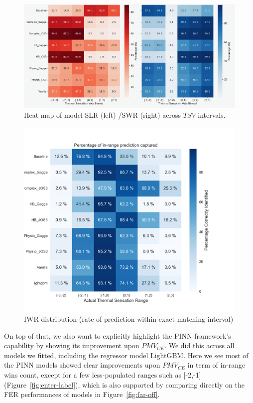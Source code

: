 \begin{figure}[htbp]
    \centering
    \includegraphics[width=0.95\linewidth]{figures/SignWL (1).png}
    \caption{Heat map of model SLR (left) /SWR (right) across $TSV$ intervals.}
    \label{fig:sign-winloss}
\end{figure}
\begin{figure}[htbp]
    \centering
    \includegraphics[width=0.75\linewidth]{figures/InRangeSense.png}
    \caption{IWR distribution (rate of prediction within exact matching interval) }
    \label{fig:in-range-sense}
\end{figure}

On top of that, we also want to explicitly highlight the PINN framework's capability by showing its improvement upon $PMV_{CE}$. We did this across all models we fitted, including the regressor model LightGBM. Here we see most of the PINN models showed clear improvements upon $PMV_{CE}$ in term of in-range wins count, except for a few less-populated ranges such as [-2,-1] (Figure~\ref{fig:enter-label}), which is also supported by comparing directly on the FER  performances of models in Figure~\ref{fig:far-off}. 

